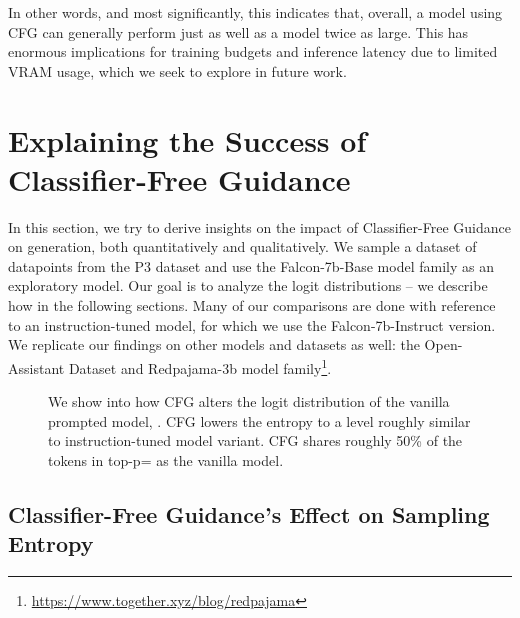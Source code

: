\documentclass{article}
\begin{document}
In other words, and most significantly, this indicates that, overall, a model using CFG can generally perform just as well as a model twice as large. This has enormous implications for training budgets and inference latency due to limited VRAM usage, which we seek to explore in future work.

\section{Explaining the Success of Classifier-Free Guidance}
\label{sct:explanation}

In this section, we try to derive insights on the impact of Classifier-Free Guidance on generation, both quantitatively and qualitatively. We sample a dataset of  datapoints from the P3 dataset \cite{sanhmultitask} and use the Falcon-7b-Base model family \cite{falcon40b} as an exploratory model. Our goal is to analyze the logit distributions -- we describe how in the following sections. Many of our comparisons are done with reference to an instruction-tuned model, for which we use the Falcon-7b-Instruct version. We replicate our findings on other models and datasets as well: the Open-Assistant Dataset \cite{kopf2023openassistant} and Redpajama-3b model family\footnote{\url{https://www.together.xyz/blog/redpajama}}.

\begin{figure}
    \centering
    \hfill
    \caption{We show into how CFG alters the logit distribution of the vanilla prompted model, . CFG lowers the entropy to a level roughly similar to instruction-tuned model variant. CFG shares roughly 50\% of the tokens in top-p= as the vanilla  model.}
    \label{fig:single-model-comparisons}
\end{figure}

\subsection{Classifier-Free Guidance's Effect on Sampling Entropy}
\label{sct:explanation:entropy}
\end{document}
